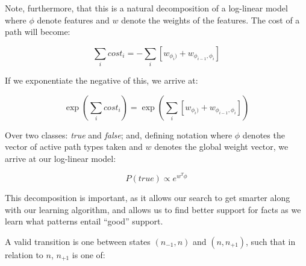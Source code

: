 \documentclass[11pt,a4paper]{article}
\def\w#1{\textit{#1}}
\begin{document}
Note, furthermore, that this is a natural decomposition
  of a log-linear model where $\phi$ denote features
  and $w$ denote the weights of the features.
The cost of a path will become:

\begin{equation}
\sum_i cost_i = - \sum_i \left[ w_{\phi_i)} + w_{\phi_{i-1}, \phi_i}\right]
\end{equation}

If we exponentiate the negative of this, we arrive at:

\begin{equation}
\exp( \sum_i cost_i )
  = \exp\left( \sum_i \left[ w_{\phi_i)} + w_{\phi_{i-1}, \phi_i} \right] \right)
\end{equation}

Over two classes: \textit{true} and \textit{false};
  and, defining notation where $\phi$ denotes the
  vector of active path types taken and $w$ denotes
  the global weight vector, we arrive at our
  log-linear model:

\begin{equation}
P(\textit{true}) \propto e^{w^{T} \phi}
\end{equation}

This decomposition is important, as it allows our
  search to get smarter along with our learning
  algorithm, and allows us to find better support
  for facts as we learn what patterns entail
  ``good'' support.

%


A valid transition is one between states
  $(n_{-1}, n)$ and $(n, n_{+1})$, such that in
  relation to $n$, $n_{+1}$ is one of:
\end{document}
